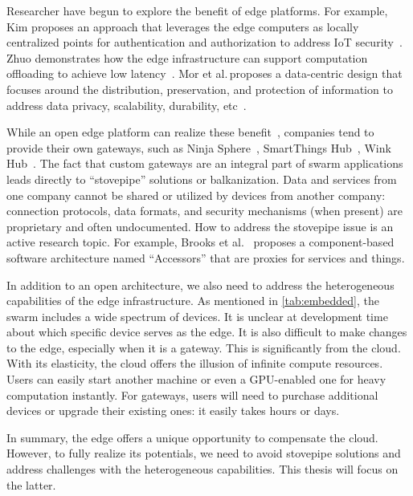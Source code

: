 Researcher have begun to explore the benefit of edge platforms. For example, Kim
proposes an approach that leverages the edge computers as locally centralized
points for authentication and authorization to address IoT
security~\cite{kim2017securing}. Zhuo demonstrates how the edge infrastructure
can support computation offloading to achieve low
latency~\cite{chen2018application}. Mor et al.\,proposes a data-centric design
that focuses around the distribution, preservation, and protection of
information to address data privacy, scalability, durability,
etc~\cite{mor2016toward}.

While an open edge platform can realize these
benefit~\cite{zachariah1001internet}, companies tend to provide their own
gateways, such as Ninja Sphere~\cite{ninja}, SmartThings Hub~\cite{smartthings},
Wink Hub~\cite{wink}. The fact that custom gateways are an integral part of
swarm applications leads directly to ``stovepipe'' solutions or
balkanization. Data and services from one company cannot be shared or utilized
by devices from another company: connection protocols, data formats, and
security mechanisms (when present) are proprietary and often undocumented. How
to address the stovepipe issue is an active research topic. For example, Brooks
et al.~\cite{brooks2018component} proposes a component-based software
architecture named ``Accessors'' that are proxies for services and things.

In addition to an open architecture, we also need to address the heterogeneous
capabilities of the edge infrastructure. As mentioned in \autoref{tab:embedded},
the swarm includes a wide spectrum of devices. It is unclear at development time
about which specific device serves as the edge. It is also difficult to make
changes to the edge, especially when it is a gateway. This is significantly from
the cloud. With its elasticity, the cloud offers the illusion of infinite
compute resources. Users can easily start another machine or even a GPU-enabled
one for heavy computation instantly. For gateways, users will need to purchase
additional devices or upgrade their existing ones: it easily takes hours or
days.

In summary, the edge offers a unique opportunity to compensate the
cloud. However, to fully realize its potentials, we need to avoid stovepipe
solutions and address challenges with the heterogeneous capabilities. This
thesis will focus on the latter.

